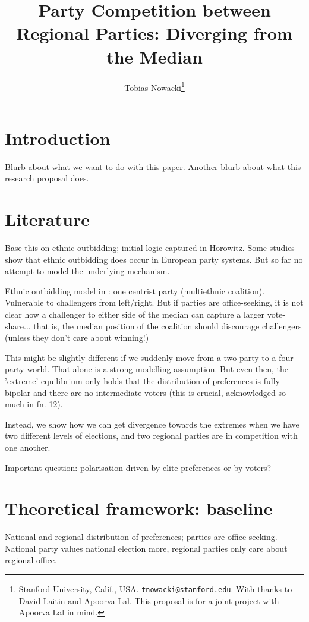 \documentclass[11pt]{article}
\title{Party Competition between Regional Parties: Diverging from the Median}
\author{Tobias Nowacki\thanks{Stanford University, Calif., USA. \texttt{tnowacki@stanford.edu}. With thanks to David Laitin and Apoorva Lal. This proposal is for a joint project with Apoorva Lal in mind.}}
\begin{document}
\maketitle

\onehalfspacing

\section{Introduction}

Blurb about what we want to do with this paper.
Another blurb about what this research proposal does.

\section{Literature}

Base this on ethnic outbidding; initial logic captured in Horowitz. Some studies show that ethnic outbidding does occur in European party systems. But so far no attempt to model the underlying mechanism. 

Ethnic outbidding model in \textcite{Chandra2005}: one centrist party (multiethnic coalition). Vulnerable to challengers from left/right. But if parties are office-seeking, it is not clear how a challenger to either side of the median can capture a larger vote-share... that is, the median position of the coalition should discourage challengers (unless they don't care about winning!)

This might be slightly different if we suddenly move from a two-party to a four-party world. That alone is a strong modelling assumption. But even then, the 'extreme' equilibrium only holds that the distribution of preferences is fully bipolar and there are no intermediate voters (this is crucial, acknowledged so much in fn. 12).

Instead, we show how we can get divergence towards the extremes when we have two different levels of elections, and two regional parties are in competition with one another.

Important question: polarisation driven by elite preferences or by voters?

\section{Theoretical framework: baseline}

National and regional distribution of preferences; parties are office-seeking. National party values national election more, regional parties only care about regional office.
\end{document}
